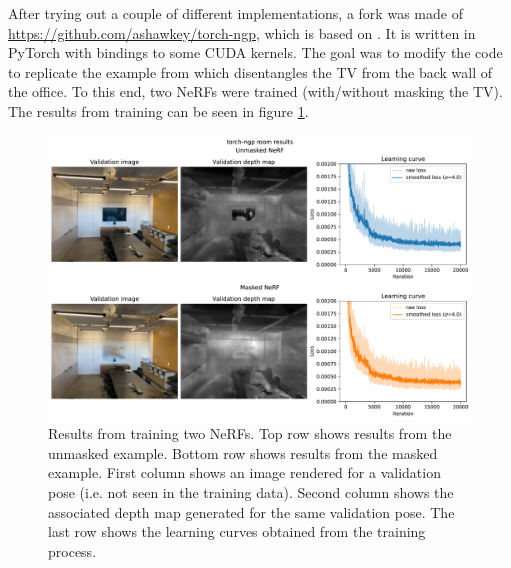 After trying out a couple of different implementations, a fork was made of \url{https://github.com/ashawkey/torch-ngp}, which is based on \cite{mueller2022}. It is written in PyTorch with bindings to some CUDA kernels. The goal was to modify the code to replicate the example from \cite{benaim2022} which disentangles the TV from the back wall of the office. To this end, two NeRFs were trained (with/without masking the TV). The results from training can be seen in figure \ref{fig:3_4-room-learning-curves}.
\begin{figure}[H]
    \centering
    \includegraphics[width=1.0\textwidth]{figures/3_4-room-learning-curves.pdf}
    \caption{Results from training two NeRFs. Top row shows results from the unmasked example. Bottom row shows results from the masked example. First column shows an image rendered for a validation pose (i.e. not seen in the training data). Second column shows the associated depth map generated for the same validation pose. The last row shows the learning curves obtained from the training process.}
    \label{fig:3_4-room-learning-curves}
\end{figure}

